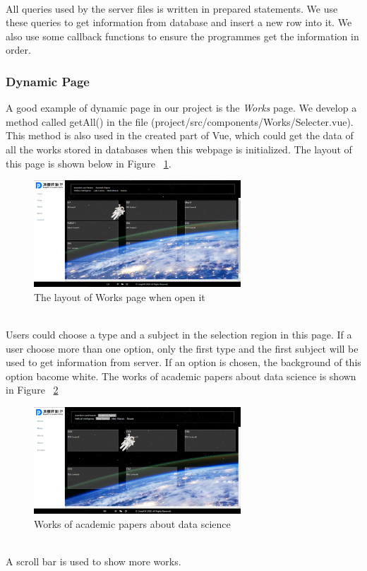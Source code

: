 \documentclass{article}
\begin{document}
~\\
\noindent
All queries used by the server files is written in prepared statements. We use
these queries to get information from database and insert a new row into it. We
also use some callback functions to ensure the programmes get the information 
in order.



\subsubsection{Dynamic Page}
A good example of dynamic page in our project is the \textit{Works} page.
We develop a method called getAll() in the file
(project/src/components/Works/Selecter.vue). This method is also used in the 
created part of Vue, which could get the data of all the works stored in databases
when this webpage is initialized. The layout of this page is shown below in 
Figure ~\ref{fig: figure5}.

\begin{figure}[h]
    \centering
    \includegraphics[height=4cm]{img/sectionPNG/Works1.png}
    \caption{The layout of Works page when open it}
    \label{fig: figure5}
\end{figure}

~\\
\noindent
Users could choose a type and a subject in the selection region in this page.
If a user choose more than one option, only the first type and the first subject
will be used to get information from server. If an option is chosen, the background
of this option bacome white. The works of academic papers about data science is shown
in Figure ~\ref{fig: figure6}

\begin{figure}[h]
    \centering
    \includegraphics[height=4cm]{img/sectionPNG/Works2.png}
    \caption{Works of academic papers about data science}
    \label{fig: figure6}
\end{figure}

~\\
\noindent
A scroll bar is used to show more works.
    
\end{document}
